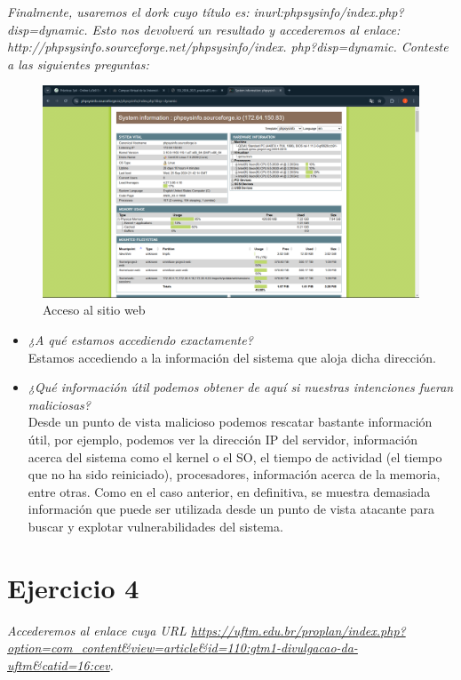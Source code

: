 \documentclass[12pt]{book}
\begin{document}
\newpage
\textit{Finalmente, usaremos el dork cuyo título es: inurl:phpsysinfo/index.php?disp=dynamic. Esto nos devolverá un resultado y accederemos al enlace:\\
http://phpsysinfo.sourceforge.net/phpsysinfo/index. php?disp=dynamic.
Conteste a las siguientes preguntas:}
\begin{figure}[h]
    \centering
    \includegraphics[width=0.5\linewidth]{Practica 3y4/images/Captura de pantalla (85).png}
    \caption{Acceso al sitio web}
    \label{fig:enter-label}
\end{figure}
\begin{itemize}
    \item\textit{¿A qué estamos accediendo exactamente?}\\
    Estamos accediendo a la información del sistema que aloja dicha dirección.
    \item\textit{¿Qué información útil podemos obtener de aquí si nuestras intenciones fueran maliciosas?}\\
    Desde un punto de vista malicioso podemos rescatar bastante información útil, por ejemplo, podemos ver la dirección IP del servidor, información acerca del sistema como el kernel o el SO, el tiempo de actividad (el tiempo que no ha sido reiniciado), procesadores, información acerca de la memoria, entre otras.
    Como en el caso anterior, en definitiva, se muestra demasiada información que puede ser utilizada desde un punto de vista atacante para buscar y explotar vulnerabilidades del sistema.
\end{itemize}

\section{Ejercicio 4}

\textit{Accederemos al enlace cuya URL \url{https://uftm.edu.br/proplan/index.php?option=com_content&view=article&id=110:gtm1-divulgacao-da-uftm&catid=16:cev}.}
\end{document}
